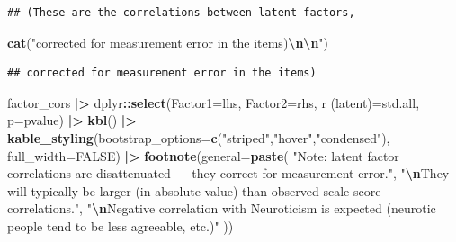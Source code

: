 \documentclass[
]{article}
\newenvironment{Shaded}{\begin{snugshade}}{\end{snugshade}}
\newcommand{\AttributeTok}[1]{\textcolor[rgb]{0.13,0.29,0.53}{#1}}
\newcommand{\ConstantTok}[1]{\textcolor[rgb]{0.56,0.35,0.01}{#1}}
\newcommand{\FunctionTok}[1]{\textcolor[rgb]{0.13,0.29,0.53}{\textbf{#1}}}
\newcommand{\NormalTok}[1]{#1}
\newcommand{\OtherTok}[1]{\textcolor[rgb]{0.56,0.35,0.01}{#1}}
\newcommand{\SpecialCharTok}[1]{\textcolor[rgb]{0.81,0.36,0.00}{\textbf{#1}}}
\newcommand{\StringTok}[1]{\textcolor[rgb]{0.31,0.60,0.02}{#1}}
\begin{document}
\begin{verbatim}
## (These are the correlations between latent factors,
\end{verbatim}

\begin{Shaded}
\begin{Highlighting}[]
\FunctionTok{cat}\NormalTok{(}\StringTok{"corrected for measurement error in the items)}\SpecialCharTok{\textbackslash{}n\textbackslash{}n}\StringTok{"}\NormalTok{)}
\end{Highlighting}
\end{Shaded}

\begin{verbatim}
## corrected for measurement error in the items)
\end{verbatim}

\begin{Shaded}
\begin{Highlighting}[]
\NormalTok{factor\_cors }\SpecialCharTok{|\textgreater{}}
\NormalTok{  dplyr}\SpecialCharTok{::}\FunctionTok{select}\NormalTok{(}\AttributeTok{Factor1=}\NormalTok{lhs, }\AttributeTok{Factor2=}\NormalTok{rhs, }\StringTok{\textasciigrave{}}\AttributeTok{r (latent)}\StringTok{\textasciigrave{}}\OtherTok{=}\NormalTok{std.all, }\AttributeTok{p=}\NormalTok{pvalue) }\SpecialCharTok{|\textgreater{}}
  \FunctionTok{kbl}\NormalTok{() }\SpecialCharTok{|\textgreater{}}
  \FunctionTok{kable\_styling}\NormalTok{(}\AttributeTok{bootstrap\_options=}\FunctionTok{c}\NormalTok{(}\StringTok{"striped"}\NormalTok{,}\StringTok{"hover"}\NormalTok{,}\StringTok{"condensed"}\NormalTok{), }\AttributeTok{full\_width=}\ConstantTok{FALSE}\NormalTok{) }\SpecialCharTok{|\textgreater{}}
  \FunctionTok{footnote}\NormalTok{(}\AttributeTok{general=}\FunctionTok{paste}\NormalTok{(}
    \StringTok{"Note: latent factor correlations are disattenuated — they correct for measurement error."}\NormalTok{,}
    \StringTok{"}\SpecialCharTok{\textbackslash{}n}\StringTok{They will typically be larger (in absolute value) than observed scale{-}score correlations."}\NormalTok{,}
    \StringTok{"}\SpecialCharTok{\textbackslash{}n}\StringTok{Negative correlation with Neuroticism is expected (neurotic people tend to be less agreeable, etc.)"}
\NormalTok{  ))}
\end{Highlighting}
\end{Shaded}
\end{document}
